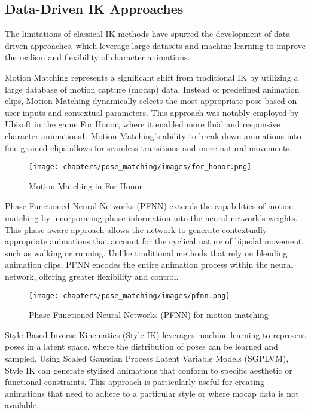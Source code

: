 \documentclass[../../main.tex]{subfiles}
\begin{document}
\subsection{Data-Driven IK Approaches}
\label{ch:pose_matching:related_work:data_driven_ik}

The limitations of classical IK methods have spurred the development of data-driven approaches, which leverage large datasets and machine learning to improve the realism and flexibility of character animations.

Motion Matching represents a significant shift from traditional IK by utilizing a large database of motion capture (mocap) data. Instead of predefined animation clips, Motion Matching dynamically selects the most appropriate pose based on user inputs and contextual parameters. This approach was notably employed by Ubisoft in the game For Honor, where it enabled more fluid and responsive character animations\ref{fig:for_honor}. Motion Matching's ability to break down animations into fine-grained clips allows for seamless transitions and more natural movements\cite{TODO}.

\begin{figure}
  \centering \texttt{[image: chapters/pose\_matching/images/for\_honor.png]}
  \caption{Motion Matching in For Honor}
  \label{fig:for_honor}
\end{figure}

Phase-Functioned Neural Networks (PFNN) \cite{TODO} extends the capabilities of motion matching by incorporating phase information into the neural network's weights. This phase-aware approach allows the network to generate contextually appropriate animations that account for the cyclical nature of bipedal movement, such as walking or running. Unlike traditional methods that rely on blending animation clips, PFNN encodes the entire animation process within the neural network, offering greater flexibility and control.

\begin{figure}
  \centering \texttt{[image: chapters/pose\_matching/images/pfnn.png]}
  \caption{Phase-Functioned Neural Networks (PFNN) for motion matching}
  \label{fig:pfnn}
\end{figure}

Style-Based Inverse Kinematics (Style IK) leverages machine learning to represent poses in a latent space, where the distribution of poses can be learned and sampled. Using Scaled Gaussian Process Latent Variable Models (SGPLVM), Style IK can generate stylized animations that conform to specific aesthetic or functional constraints. This approach is particularly useful for creating animations that need to adhere to a particular style or where mocap data is not available\cite{TODO}.
\end{document}
